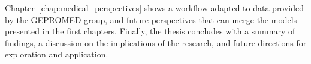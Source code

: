 Chapter~\ref{chap:medical_perspectives}
shows a workflow adapted to data provided by the GEPROMED group,  and future
perspectives that can merge the models presented in the first chapters. 
Finally, the thesis concludes with a summary of findings, a
discussion on the implications of the research, and future directions for
exploration and application.




 


